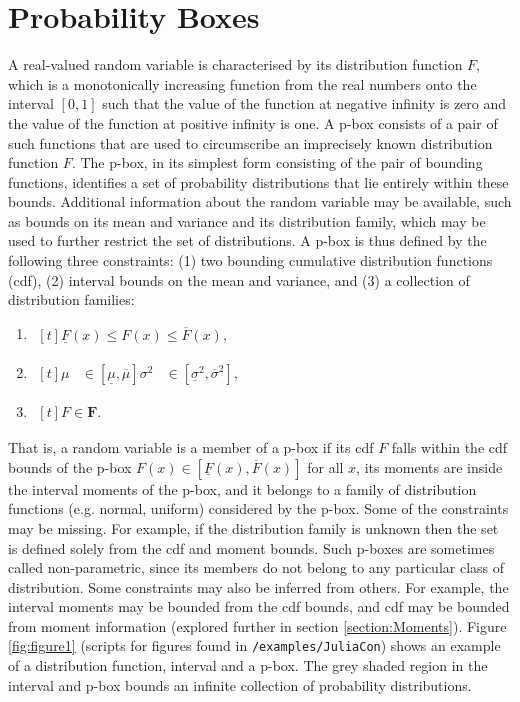 \documentclass{juliacon}
\begin{document}
\section{Probability Boxes}
\label{sec:pboxes}
A real-valued random variable is characterised by its distribution function $F$, which is a monotonically increasing function from the real numbers onto the interval $[0, 1]$ such that the value of the function at negative infinity is zero and the value of the function at positive infinity is one.  A p-box consists of a pair of such functions that are used to circumscribe an imprecisely known distribution function $F$. The p-box, in its simplest form consisting of the pair of bounding functions, identifies a set of probability distributions that lie entirely within these bounds. Additional information about the random variable may be available, such as bounds on its mean and variance and its distribution family, which may be used to further restrict the set of distributions. A p-box is thus defined by the following three constraints: (1) two bounding cumulative distribution functions (cdf), (2) interval bounds on the mean and variance, and (3) a collection of distribution families:
\begin{enumerate}
  \item $\begin{aligned}[t]
    \underline{F}(x) \leq F(x) \leq \overline{F}(x),
  \end{aligned}$
  \item $\begin{aligned}[t]
    \mu &\in [\underline{ \mu }, \overline{ \mu }]
    \sigma^2 &\in [\underline{\sigma}^2 , \overline{\sigma}^2],
  \end{aligned}$
  \item $\begin{aligned}[t]
      F \in \bm{F}.
  \end{aligned}$
\end{enumerate}
\noindent That is, a random variable is a member of a p-box if its cdf $F$ falls within the cdf bounds of the p-box $F(x) \in [\underline{F}(x), \overline{F}(x)]$ for all $x$, its moments are inside the interval moments of the p-box, and it belongs to a family of distribution functions (e.g. normal, uniform) considered by the p-box. Some of the constraints may be missing. For example, if the distribution family is unknown then the set is defined solely from the cdf and moment bounds. Such p-boxes are sometimes called non-parametric, since its members do not belong to any particular class of distribution. Some constraints may also be inferred from others. For example, the interval moments may be bounded from the cdf bounds, and cdf may be bounded from moment information (explored further in section \ref{section:Moments}). Figure \ref{fig:figure1} (scripts for figures found in \texttt{/examples/JuliaCon}) shows an example of a distribution function, interval and a p-box. The grey shaded region in the interval and p-box bounds an infinite collection of probability distributions.
\end{document}
